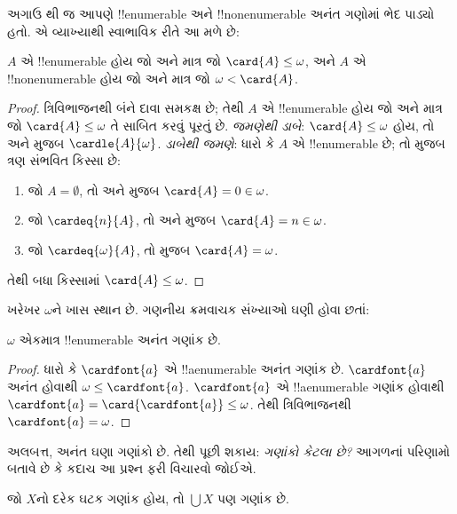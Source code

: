 \documentclass[../../../include/open-logic-section]{subfiles}
\begin{document}
અગાઉ થી જ
આપણે !!{enumerable} અને !!{nonenumerable} અનંત
ગણોમાં ભેદ પાડ્યો હતો. એ વ્યાખ્યાથી સ્વાભાવિક રીતે
આ મળે છે:

\begin{prop}
$A$ એ !!{enumerable} હોય જો અને માત્ર જો
$\card{A} \leq \omega$, અને $A$ એ
!!{nonenumerable} હોય જો અને માત્ર જો
$\omega < \card{A}$.
\end{prop}

\begin{proof}
ત્રિવિભાજનથી બંને દાવા સમકક્ષ છે; તેથી
$A$ એ !!{enumerable} હોય જો અને માત્ર જો
$\card{A} \leq \omega$ તે સાબિત કરવું પૂરતું છે.
\emph{જમણેથી ડાબે}: $\card{A} \leq \omega$ હોય, તો
અને  મુજબ
$\cardle{A}{\omega}$.
\emph{ડાબેથી જમણે}: ધારો કે $A$ એ
!!{enumerable} છે; તો
 મુજબ
ત્રણ સંભવિત કિસ્સા છે:
\begin{enumerate}
	\item જો $A = \emptyset$, તો
	 અને
	મુજબ $\card{A} = 0 \in \omega$.
	\item જો $\cardeq{n}{A}$, તો
	 અને
	મુજબ $\card{A} = n \in \omega$.
	\item જો $\cardeq{\omega}{A}$, તો
	 મુજબ $\card{A} = \omega$.
\end{enumerate}
તેથી બધા કિસ્સામાં $\card{A} \leq \omega$.
\end{proof}
\noindent
ખરેખર $\omega$ને ખાસ સ્થાન છે. ગણનીય ક્રમવાચક
સંખ્યાઓ ઘણી હોવા છતાં:

\begin{cor}
$\omega$ એકમાત્ર !!{enumerable} અનંત ગણાંક છે.
\end{cor}

\begin{proof}
ધારો કે $\cardfont{a}$ એ !!a{enumerable} અનંત ગણાંક
છે. $\cardfont{a}$ અનંત હોવાથી
$\omega \leq \cardfont{a}$. $\cardfont{a}$ એ
!!a{enumerable} ગણાંક હોવાથી
$\cardfont{a} = \card{\cardfont{a}} \leq \omega$.
તેથી ત્રિવિભાજનથી $\cardfont{a} = \omega$.
\end{proof}

અલબત્ત, અનંત ઘણા ગણાંકો છે. તેથી પૂછી શકાય:
\emph{ગણાંકો કેટલા છે?} આગળનાં પરિણામો બતાવે છે
કે કદાચ આ પ્રશ્ન ફરી વિચારવો જોઈએ.

\begin{prop}
જો $X$નો દરેક ઘટક ગણાંક હોય, તો $\bigcup X$
પણ ગણાંક છે.
\end{prop}
\end{document}
